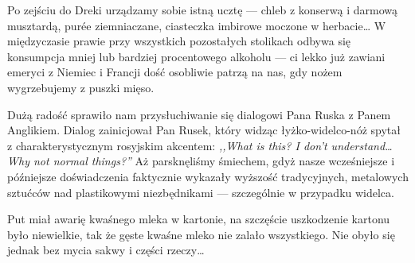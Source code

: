 
Po zejściu do Dreki urządzamy sobie istną ucztę --- chleb z konserwą i darmową musztardą, purée ziemniaczane, ciasteczka imbirowe moczone w herbacie… W międzyczasie prawie przy wszystkich pozostałych stolikach odbywa się konsumpcja mniej lub bardziej procentowego alkoholu --- ci lekko już zawiani emeryci z Niemiec i Francji dość osobliwie patrzą na nas, gdy nożem wygrzebujemy z puszki mięso.

Dużą radość sprawiło nam przysłuchiwanie się dialogowi Pana Ruska z Panem Anglikiem. Dialog zainicjował Pan Rusek, który widząc łyżko-widelco-nóż spytał z charakterystycznym rosyjskim akcentem: \emph{,,What is this? I don’t understand… Why not normal things?''} Aż parsknęliśmy śmiechem, gdyż nasze wcześniejsze i późniejsze doświadczenia faktycznie wykazały wyższość tradycyjnych, metalowych sztućców nad plastikowymi niezbędnikami --- szczególnie w przypadku widelca.

Put miał awarię kwaśnego mleka w kartonie, na szczęście uszkodzenie kartonu było niewielkie, tak że gęste kwaśne mleko nie zalało wszystkiego. Nie obyło się jednak bez mycia sakwy i części rzeczy…



